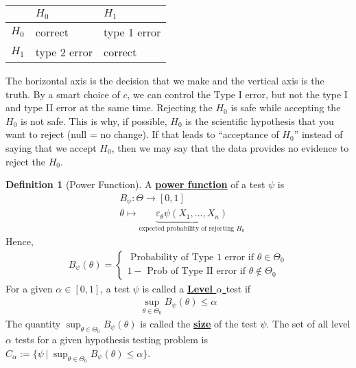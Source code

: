 \documentclass[11pt]{scrartcl}
\theoremstyle{definition}
\newtheorem{definition}{Definition}
\theoremstyle{remark}
\newcommand{\dfn}[1]{\textbf{\underline{#1}}}
\begin{document}
{\begin{table}[H]
\centering 
\begin{tabular}{|l|l|l|}
\hline
       & $H_0$ & $H_1$   \\ \hline
$H_0$  & correct  & type 1 error  \\ \hline
$H_1$ & type 2 error & correct  \\ \hline

\end{tabular}
\end{table}

The horizontal axis is the decision that we make and the vertical axis is the truth. By a smart choice of $c$, we can control the Type I error, but not the type I and type II error at the same time. Rejecting the $H_0$ is safe while accepting the $H_0$ is not safe. This is why, if possible, $H_0$ is the scientific hypothesis that you want to reject (null = no change). If that leads to ``acceptance of $H_0$'' instead of saying that we accept $H_0$, then we may say that the data provides no evidence to reject the $H_0$. 


\begin{definition}[Power Function]
	A \dfn{power function} of a test $\psi$ is 
	\begin{align*}
		& B_\psi: \Theta \rightarrow [0,1] \\
		& \theta \mapsto  \underbrace{\varepsilon_\theta \psi (X_1, ..., X_n)}_{\text{expected probability of rejecting $H_0$}}
	\end{align*}
	Hence, 
	\begin{align*}
		B_\psi(\theta) = \begin{cases}
			\text{ Probability of Type 1 error if $\theta \in \Theta_0$} \\
			1 - \text{ Prob of Type II error if $\theta \notin \Theta_0$ }
		\end{cases}
	\end{align*}
	For a given $\alpha \in [0,1]$, a test $\psi$ is called a \dfn{Level $ \alpha$ }test if 
	\begin{align*}
		\sup_{\theta \in \Theta_0} B_\psi (\theta) \leq \alpha 
	\end{align*}
	The quantity $\sup_{\theta \in \Theta_0} B_\psi(\theta)$ is called the \dfn{size} of the test $\psi$. The set of all level $\alpha$ tests for a given hypothesis testing problem is $C_\alpha := \{ \psi\ |\ \sup_{\theta \in \Theta_0 } B_\psi (\theta) \leq \alpha \}$. 
\end{definition}

}
\end{document}
